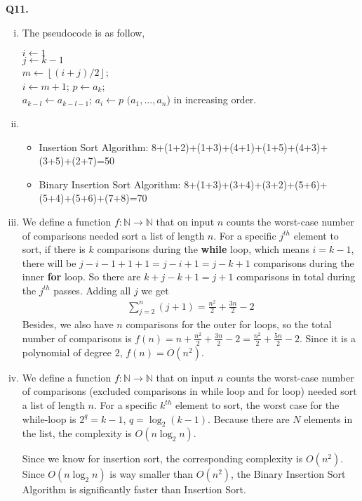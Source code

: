 \documentclass{article}[12pt]
\begin{document}
\noindent \textbf{Q11.}
\begin{enumerate}[(i)]
\item The pseudocode is as follow,\\
\begin{algorithm}[H]
  {
  $i\leftarrow 1$\\
  $j\leftarrow k-1$\\
   {
   		$m\leftarrow \left\lfloor (i+j)/2\right\rfloor$;\\
   		 {$i\leftarrow m+1$;}
   }
  $p\leftarrow a_k$;\\
   {$a_{k-l}\leftarrow a_{k-l-1}$;}
  $a_i\leftarrow p$
  }
  \Return $(a_1,...,a_n$) in increasing order.
\end{algorithm}
\item 
\begin{itemize}
\item Insertion Sort Algorithm: 8+(1+2)+(1+3)+(4+1)+(1+5)+(4+3)+(3+5)+(2+7)=50
\item Binary Insertion Sort Algorithm: 8+(1+3)+(3+4)+(3+2)+(5+6)+(5+4)+(5+6)+(7+8)=70
\end{itemize}
\item We define a function $f:\mathbb{N}\longrightarrow\mathbb{N}$ that on input $n$ counts the worst-case number of comparisons needed sort a list of length $n$. For a specific $j^{th}$ element to sort, if there is $k$ comparisons during the\textbf{ while} loop, which means $i=k-1$, there will be $j-i-1+1+1=j-i+1=j-k+1$ comparisons during the inner \textbf{for} loop. So there are $k+j-k+1=j+1$ comparisons in total during the $j^{th}$ passes. Adding all $j$ we get
\begin{align*}
\sum_{j=2}^n (j+1)=\frac{n^2}{2}+\frac{3n}{2}-2
\end{align*}
Besides, we also have $n$ comparisons for the outer for loops, so the total number of comparisons is $f(n)=n+\frac{n^2}{2}+\frac{3n}{2}-2=\frac{n^2}{2}+\frac{5n}{2}-2$. Since it is a polynomial of degree $2$, $f(n)=O(n^2)$.
\item We define a function $f:\mathbb{N}\longrightarrow\mathbb{N}$ that on input $n$ counts the worst-case number of comparisons (excluded comparisons in while loop and for loop) needed sort a list of length $n$. For a specific $k^{th}$ element to sort, the worst case for the while-loop is $2^q=k-1$, $q=\log_2(k-1)$. Because there are $N$ elements in the list, the complexity is $O(n\log_2 n)$. 
\par Since we know for insertion sort, the corresponding complexity is $O(n^2)$. Since $O(n\log_2 n)$ is way smaller than $O(n^2)$, the Binary Insertion Sort Algorithm is significantly faster than Insertion Sort.

\end{enumerate}











\end{document}
